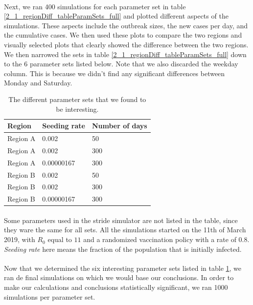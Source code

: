 \documentclass[runningheads]{llncs}
\begin{document}
\paragraph{} Next, we ran 400 simulations for each parameter set in table \ref{2_1_regionDiff_tableParamSets_full} and plotted different aspects of the simulations. These aspects include the outbreak sizes, the new cases per day, and the cumulative cases. We then used these plots to compare the two regions and visually selected plots that clearly showed the difference between the two regions. We then narrowed the sets in table \ref{2_1_regionDiff_tableParamSets_full} down to the 6 parameter sets listed below. Note that we also discarded the weekday column. This is because we didn't find any significant differences between Monday and Saturday.

\begin{table}[H]
\centering
\begin{tabular}{|l|l|l|}
\hline
\textbf{Region} & \textbf{Seeding rate} & \textbf{Number of days} \\
\hline
Region A & 0.002      & 50 \\
\hline
Region A & 0.002      & 300 \\
\hline
Region A & 0.00000167 & 300 \\
\hline
Region B & 0.002      & 50 \\
\hline
Region B & 0.002      & 300 \\
\hline
Region B & 0.00000167 & 300 \\
\hline
\end{tabular}
\caption{The different parameter sets that we found to be interesting.}
\label{2_1_regionDiff_tableParamSets_filtered}
\end{table}


\paragraph{} Some parameters used in the stride simulator are not listed in the table, since they ware the same for all sets. All the simulations started on the 11th of March 2019, with $R_0$ equal to $11$ and a randomized vaccination policy with a rate of $0.8$. \textit{Seeding rate} here means the fraction of the population that is initially infected.

\paragraph{} Now that we determined the six interesting parameter sets listed in table \ref{2_1_regionDiff_tableParamSets_filtered}, we ran de final simulations on which we would base our conclusions. In order to make our calculations and conclusions statistically significant, we ran 1000 simulations per parameter set.
\end{document}
